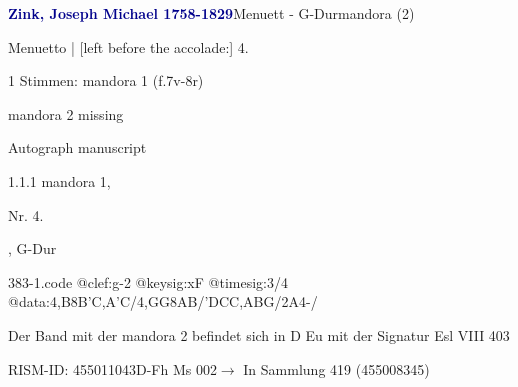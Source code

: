 \documentclass[twocolumn]{book}
\begin{document}
\par \vspace{7pt} \textcolor{darkblue}{\textbf{Zink, Joseph Michael  1758-1829}}\hfillplus{\textbf{[383]}}\newline Menuett - G-Dur\newline mandora (2)
\par \begin{itshape}[f.7v, at left:] Menuetto | [left before the accolade:] 4.\end{itshape} 
\par \textcolor{darkblue}{}  1 Stimmen: mandora 1  (f.7v-8r)\newline \begin{small} mandora 2 missing\end{small} \newline Autograph manuscript
\par 1.1.1  mandora 1, \begin{itshape}Nr. 4.\end{itshape}, G-Dur  
\begin{filecontents*}{383-1.code}
@clef:g-2
@keysig:xF
@timesig:3/4
@data:4,B8B'C,A'C/4,GG{8AB}/'DCC,ABG/2A4-/
\end{filecontents*}
\newline
%
\par Der Band mit der mandora 2 befindet sich in D Eu mit der Signatur Esl VIII 403
\par RISM-ID: 455011043\newline D-Fh  Ms 002\newline $\rightarrow$ In Sammlung 419 (455008345)
      
\end{document}
